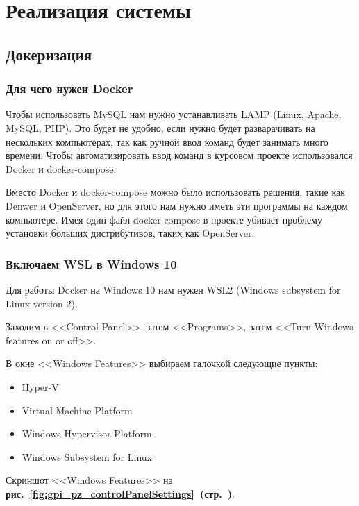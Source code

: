 \newpage

\section{Реализация системы}

\subsection{Докеризация}

\subsubsection*{Для чего нужен Docker}

Чтобы использовать MySQL нам нужно устанавливать LAMP (Linux, Apache, MySQL, PHP).
Это будет не удобно, если нужно будет разварачивать на нескольких компьютерах,
так как ручной ввод команд будет занимать много времени.
Чтобы автоматизировать ввод команд в курсовом проекте использовался Docker и docker-compose.

Вместо Docker и docker-compose можно было использовать решения, такие как Denwer и OpenServer,
но для этого нам нужно иметь эти программы на каждом компьютере. Имея один файл docker-compose
в проекте убивает проблему установки больших дистрибутивов, таких как OpenServer.

\subsubsection*{Включаем WSL в Windows 10}

Для работы Docker на Windows 10 нам нужен WSL2 (Windows subsystem for Linux version 2).

Заходим в <<Control Panel>>, затем <<Programs>>, затем <<Turn Windows features on or off>>.

В окне <<Windows Features>> выбираем галочкой следующие пункты:

\begin{itemize}
    \item Hyper-V
    \item Virtual Machine Platform
    \item Windows Hypervisor Platform
    \item Windows Subsystem for Linux
\end{itemize}

Скриншот <<Windows Features>> на
\textbf{рис.~\ref{fig:gpi_pz_controlPanelSettings}~(стр.~\pageref{fig:gpi_pz_controlPanelSettings})}.


